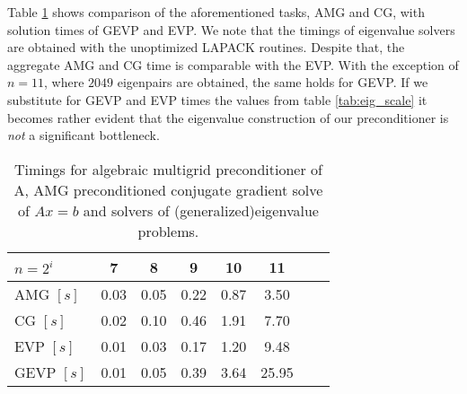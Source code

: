 \documentclass[10pt, a4paper]{article}
\begin{document}
Table \ref{tab:performance} shows comparison of the aforementioned tasks, AMG
and CG, with solution times of GEVP and EVP. We note that the timings of
eigenvalue solvers are obtained with the unoptimized LAPACK routines. Despite
that, the aggregate AMG and CG time is comparable with the EVP. With the exception 
of $n=11$, where $2049$ eigenpairs are obtained, the same holds for GEVP. If we
substitute for GEVP and EVP times the values from table \ref{tab:eig_scale} it
becomes rather evident that the eigenvalue construction of our preconditioner is
\textit{not} a significant bottleneck.
%
\begin{table}[ht]
  \caption{Timings for algebraic multigrid preconditioner of A, AMG preconditioned 
  conjugate gradient solve of $Ax=b$ and solvers of (generalized)eigenvalue
  problems.}
\label{tab:performance}
\footnotesize{
\begin{tabular}{l|ccccccc}
$n=2^i$                 &  7    &     8 &     9 & 10    & 11\\
\hline
AMG   $\left[s\right]$  & 0.03  &  0.05 &  0.22 &  0.87 & 3.50\\
CG    $\left[s\right]$  & 0.02  &  0.10 &  0.46 &  1.91 & 7.70\\
EVP   $\left[s\right]$  & 0.01  & 0.03  & 0.17  & 1.20  & 9.48\\
GEVP  $\left[s\right]$  & 0.01  & 0.05  & 0.39  & 3.64  & 25.95\\
\end{tabular}
}
\end{table}
\end{document}
